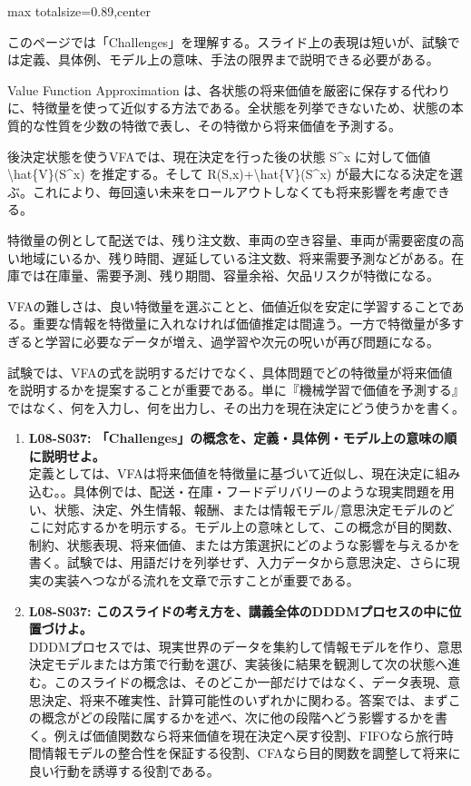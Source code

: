 \begin{minipage}[t]{0.58\textwidth}
\begin{adjustbox}{max totalsize={\textwidth}{0.89\textheight},center}
\begin{minipage}{\textwidth}\scriptsize
{}このページでは「Challenges」を理解する。スライド上の表現は短いが、試験では定義、具体例、モデル上の意味、手法の限界まで説明できる必要がある。\par
Value Function Approximation は、各状態の将来価値を厳密に保存する代わりに、特徴量を使って近似する方法である。全状態を列挙できないため、状態の本質的な性質を少数の特徴で表し、その特徴から将来価値を予測する。\par
後決定状態を使うVFAでは、現在決定を行った後の状態 S\textasciicircum{}x に対して価値 \textbackslash{}hat\{V\}(S\textasciicircum{}x) を推定する。そして R(S,x)+\textbackslash{}hat\{V\}(S\textasciicircum{}x) が最大になる決定を選ぶ。これにより、毎回遠い未来をロールアウトしなくても将来影響を考慮できる。\par
特徴量の例として配送では、残り注文数、車両の空き容量、車両が需要密度の高い地域にいるか、残り時間、遅延している注文数、将来需要予測などがある。在庫では在庫量、需要予測、残り期間、容量余裕、欠品リスクが特徴になる。\par
VFAの難しさは、良い特徴量を選ぶことと、価値近似を安定に学習することである。重要な情報を特徴量に入れなければ価値推定は間違う。一方で特徴量が多すぎると学習に必要なデータが増え、過学習や次元の呪いが再び問題になる。\par
試験では、VFAの式を説明するだけでなく、具体問題でどの特徴量が将来価値を説明するかを提案することが重要である。単に『機械学習で価値を予測する』ではなく、何を入力し、何を出力し、その出力を現在決定にどう使うかを書く。\par{}\begin{enumerate}\item \textbf{L08-S037: 「Challenges」の概念を、定義・具体例・モデル上の意味の順に説明せよ。}\\定義としては、VFAは将来価値を特徴量に基づいて近似し、現在決定に組み込む。。具体例では、配送・在庫・フードデリバリーのような現実問題を用い、状態、決定、外生情報、報酬、または情報モデル/意思決定モデルのどこに対応するかを明示する。モデル上の意味として、この概念が目的関数、制約、状態表現、将来価値、または方策選択にどのような影響を与えるかを書く。試験では、用語だけを列挙せず、入力データから意思決定、さらに現実の実装へつながる流れを文章で示すことが重要である。\item \textbf{L08-S037: このスライドの考え方を、講義全体のDDDMプロセスの中に位置づけよ。}\\DDDMプロセスでは、現実世界のデータを集約して情報モデルを作り、意思決定モデルまたは方策で行動を選び、実装後に結果を観測して次の状態へ進む。このスライドの概念は、そのどこか一部だけではなく、データ表現、意思決定、将来不確実性、計算可能性のいずれかに関わる。答案では、まずこの概念がどの段階に属するかを述べ、次に他の段階へどう影響するかを書く。例えば価値関数なら将来価値を現在決定へ戻す役割、FIFOなら旅行時間情報モデルの整合性を保証する役割、CFAなら目的関数を調整して将来に良い行動を誘導する役割である。\end{enumerate}

\end{minipage}
\end{adjustbox}
\end{minipage}
